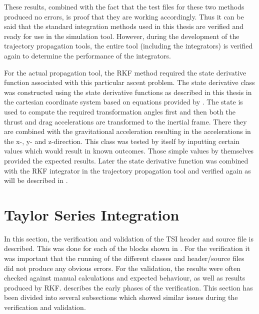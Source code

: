 \noindent
These results, combined with the fact that the test files for these two methods produced no errors, is proof that they are working accordingly. Thus it can be said that the standard integration methods used in this thesis are verified and ready for use in the simulation tool. However, during the development of the trajectory propagation tools, the entire tool (including the integrators) is verified again to determine the performance of the integrators.

For the actual propagation tool, the \ac{RKF} method required the state derivative function associated with this particular ascent problem. The state derivative class was constructed using the state derivative functions as described in this thesis in the cartesian coordinate system based on equations provided by \cite{mooij1994motion}. The state is used to compute the required transformation angles first and then both the thrust and drag accelerations are transformed to the inertial frame. There they are combined with the gravitational acceleration resulting in the accelerations in the x-, y- and z-direction. This class was tested by itself by inputting certain values which would result in known outcomes. Those simple values by themselves provided the expected results. Later the state derivative function was combined with the \ac{RKF} integrator in the trajectory propagation tool and verified again as will be described in .  



\section{Taylor Series Integration}
\label{sec:tsiverval}
In this section, the verification and validation of the \ac{TSI} header and source file is described. This was done for each of the blocks shown in . For the verification it was important that the running of the different classes and header/source files did not produce any obvious errors. For the validation, the results were often checked against manual calculations and expected behaviour, as well as results produced by \ac{RKF}.   describes the early phases of the verification. This section has been divided into several subsections which showed similar issues during the verification and validation.

